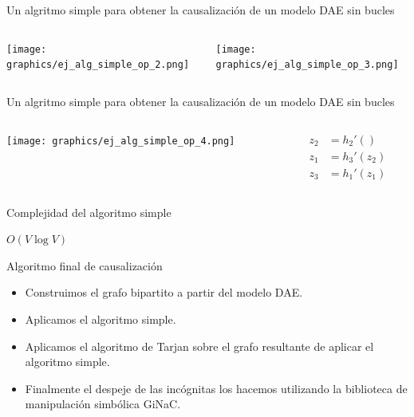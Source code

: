 \begin{frame}[fragile]{Un algritmo simple para obtener la causalización de un modelo DAE sin bucles}
\begin{columns}
    \begin{column}{0.5\textwidth}
        \texttt{[image: graphics/ej\_alg\_simple\_op\_2.png]}
    \end{column}
    \begin{column}{0.5\textwidth}
        \texttt{[image: graphics/ej\_alg\_simple\_op\_3.png]}
    \end{column}
\end{columns}
\end{frame}

\begin{frame}[fragile]{Un algritmo simple para obtener la causalización de un modelo DAE sin bucles}
\begin{columns}
    \begin{column}{0.5\textwidth}
    \begin{center} 
        \texttt{[image: graphics/ej\_alg\_simple\_op\_4.png]}
    \end{center}
    \end{column}
    \begin{column}{0.5\textwidth}
        \begin{align*}
            z_{2} &= h_{2}'() \\
            z_{1} &= h_{3}'(z_{2}) \\
            z_{3} &= h_{1}'(z_{1}) 
        \end{align*}
    \end{column}
\end{columns}
\end{frame}

\begin{frame}[fragile]{Complejidad del algoritmo simple}
\begin{center}
    $O(V\log V)$
\end{center}
\end{frame}

\begin{frame}{Algoritmo final de causalización}
\begin{itemize}
    \item<1-> Construimos el grafo bipartito a partir del modelo DAE.
    \item<2-> Aplicamos el algoritmo simple.
    \item<3-> Aplicamos el algoritmo de Tarjan sobre el grafo resultante de aplicar el algoritmo simple.
    \item<4-> Finalmente el despeje de las incógnitas los hacemos utilizando la biblioteca de manipulación simbólica GiNaC.
\end{itemize}
\end{frame}

